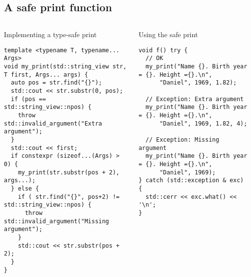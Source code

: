 \subsection{A safe print function}

\begin{frame}[t,fragile]

\begin{columns}[T]

\begin{block}{Implementing a type-safe print}
\begin{lstlisting}
template <typename T, typename... Args>
void my_print(std::string_view str, T first, Args... args) {
  auto pos = str.find("{}");
  std::cout << str.substr(0, pos);
  if (pos == std::string_view::npos) { 
    throw std::invalid_argument("Extra argument"); 
  }
  std::cout << first;
  if constexpr (sizeof...(Args) > 0) {
    my_print(str.substr(pos + 2), args...);
  } else {
    if ( str.find("{}", pos+2) != std::string_view::npos) {
      throw std::invalid_argument("Missing argument");
    }
    std::cout << str.substr(pos + 2);
  }
}
\end{lstlisting}
\end{block}

\pause
{}
\begin{block}{Using the safe print}
\begin{lstlisting}
void f() try {
  // OK
  my_print("Name {}. Birth year = {}. Height ={}.\n", 
      "Daniel", 1969, 1.82);

  // Exception: Extra argument
  my_print("Name {}. Birth year = {}. Height ={}.\n", 
      "Daniel", 1969, 1.82, 4);

  // Exception: Missing argument
  my_print("Name {}. Birth year = {}. Height ={}.\n", 
      "Daniel", 1969);
} catch (std::exception & exc) { 
  std::cerr << exc.what() << '\n'; 
}
\end{lstlisting}
\end{block}

\end{columns}
\end{frame}
